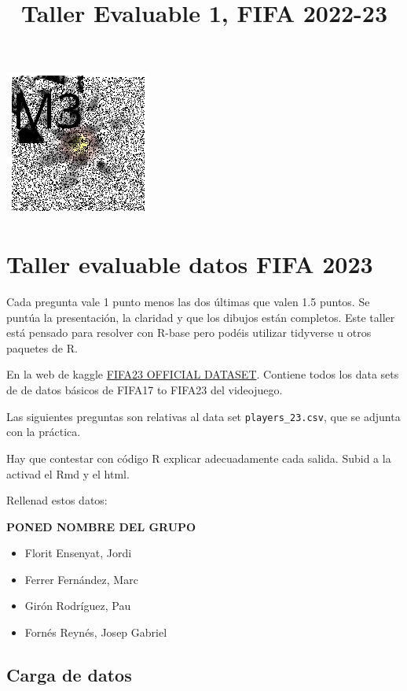 \documentclass[
]{article}
\title{Taller Evaluable 1, FIFA 2022-23}
\author{}
\date{\vspace{-2.5em}}
\providecommand{\tightlist}{%
  \setlength{\itemsep}{0pt}\setlength{\parskip}{0pt}}
\begin{document}
\maketitle

\begin{center}\includegraphics[width=0.1\linewidth]{logoM3} \end{center}

\hypertarget{taller-evaluable-datos-fifa-2023}{%
\section{Taller evaluable datos FIFA
2023}\label{taller-evaluable-datos-fifa-2023}}

Cada pregunta vale 1 punto menos las dos últimas que valen 1.5 puntos.
Se puntúa la presentación, la claridad y que los dibujos están
completos. Este taller está pensado para resolver con R-base pero podéis
utilizar tidyverse u otros paquetes de R.

En la web de kaggle
\href{https://www.kaggle.com/datasets/bryanb/fifa-player-stats-database}{FIFA23
OFFICIAL DATASET}. Contiene todos los data sets de de datos básicos de
FIFA17 to FIFA23 del videojuego.

Las siguientes preguntas son relativas al data set
\texttt{players\_23.csv}, que se adjunta con la práctica.

Hay que contestar con código R explicar adecuadamente cada salida. Subid
a la activad el Rmd y el html.

Rellenad estos datos:

\textbf{PONED NOMBRE DEL GRUPO}

\begin{itemize}
\tightlist
\item
  Florit Ensenyat, Jordi
\item
  Ferrer Fernández, Marc
\item
  Girón Rodríguez, Pau
\item
  Fornés Reynés, Josep Gabriel
\end{itemize}

\hypertarget{carga-de-datos}{%
\subsection{Carga de datos}\label{carga-de-datos}}
\end{document}
